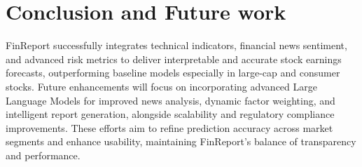 \documentclass[3p,times,procedia]{elsarticle}
\begin{document}
\section{Conclusion and Future work}
FinReport successfully integrates technical indicators, financial news sentiment, and advanced risk metrics to deliver interpretable and accurate stock earnings forecasts, outperforming baseline models especially in large-cap and consumer stocks. Future enhancements will focus on incorporating advanced Large Language Models for improved news analysis, dynamic factor weighting, and intelligent report generation, alongside scalability and regulatory compliance improvements. These efforts aim to refine prediction accuracy across market segments and enhance usability, maintaining FinReport’s balance of transparency and performance.


\end{document}
